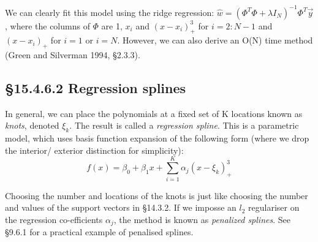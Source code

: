 \documentclass{amsart}
\begin{document}
We can clearly fit this model using the ridge regression:
$\hat{w} = (\Phi^T \Phi + \lambda I_N)^{-1} \Phi^T \vec{y}$, where the columns of $\Phi$ are
1, $x_i$ and $(x - x_i)^3_+$ for $i=2:N-1$ and $(x - x_i)_+$ for $i=1$ or $i=N$. However, we
can also derive an O(N) time method (Green and Silverman 1994, \S 2.3.3).

\subsection{\S 15.4.6.2 Regression splines}

In general, we can place the polynomials at a fixed set of K locations known as \emph{knots},
denoted $\xi_k$. The result is called a \emph{regression spline}. This is a parametric model,
which uses basis function expansion of the following form (where we drop the interior/
exterior distinction for simplicity):
\[
f(x) = \beta_0 + \beta_1 x + \sum_{i=1}^K \alpha_j (x - \xi_k)^3_+
\]

Choosing the number and locations of the knots is just like choosing the number and values 
of the support vectors in \S 14.3.2. If we imposse an $l_2$ regulariser on the regression
co-efficients $\alpha_j$, the method is known as \emph{penalized splines}. See
\S 9.6.1 for a practical example of penalised splines.
\end{document}

